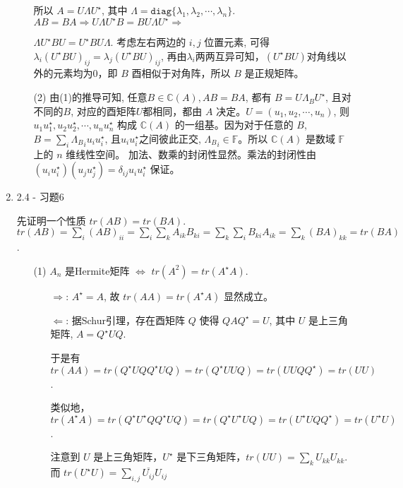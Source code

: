 \documentclass{article}
\begin{document}
\begin{spacing}{1.5}
\begin{enumerate}
\begin{itemize}
            所以 $A = U\Lambda U^\star$, 其中 $\Lambda = \mathtt{diag}\{\lambda_1, \lambda_2, \cdots, \lambda_n\}$. $AB=BA \Rightarrow U\Lambda U^\star B = B U\Lambda U^\star \Rightarrow$ 
            
            $\Lambda U^\star B U = U^\star B U \Lambda$. 考虑左右两边的 $i,j$ 位置元素, 可得 $\lambda_i (U^\star B U)_{ij} = \lambda_j (U^\star B U)_{ij}$, 再由$\lambda_i$两两互异可知，$(U^\star B U)$对角线以外的元素均为0，即 $B$ 酉相似于对角阵，所以 $B$ 是正规矩阵。
        \item[(2)] 由(1)的推导可知, 任意$B\in\mathbb{C}(A), AB=BA$, 都有 $B = U\Lambda_B U^\star$, 且对不同的$B$, 对应的酉矩阵$U$都相同，都由 $A$ 决定。$U = (u_1, u_2, \cdots, u_n)$, 则 $u_1u_1^\star, u_2u_2^\star,\cdots, u_nu_n^\star$ 构成 $\mathbb{C}(A)$
        的一组基。因为对于任意的 $B$, $B= \sum_i {\Lambda_B}_i u_iu_i^\star$, 且$u_iu_i^\star$之间彼此正交, ${\Lambda_B}_{i}\in\mathbb{F}$。所以 $\mathbb{C}(A)$ 是数域 $\mathbb{F}$ 上的 $n$ 维线性空间。
        加法、数乘的封闭性显然。乘法的封闭性由 $(u_iu_i^\star)(u_ju_j^\star) = \delta_{ij} u_iu_i^\star$ 保证。
        
    \end{itemize}
    
    

    \item 2.4 - 习题6
    
    先证明一个性质 $tr(AB) = tr(BA)$. $tr(AB) = \sum_{i} (AB)_{ii} = \sum_{i} \sum_{k} A_{ik}B_{ki} = \sum_{k}\sum_{i} B_{ki}A_{ik} = \sum_k (BA)_{kk} = tr(BA)$.

    \begin{itemize}
        \item [(1)] $A_n$ 是Hermite矩阵 $\Leftrightarrow$ $tr(A^2) = tr(A^\star A)$.
        \begin{itemize}
            \item [$\Rightarrow$:] $A^\star = A$, 故 $tr(AA) = tr(A^\star A)$ 显然成立。
            \item [$\Leftarrow$:] 据Schur引理，存在酉矩阵 $Q$ 使得 $QAQ^\star = U$, 其中 $U$ 是上三角矩阵, $A = Q^\star U Q$.
            
            于是有 $tr(AA) = tr(Q^\star U Q Q^\star U Q) = tr(Q^\star U U Q) = tr(UUQQ^\star) = tr(UU)$.
            
            类似地，$tr(A^\star A) = tr(Q^\star U^\star QQ^\star U Q) = tr(Q^\star U^\star U Q) = tr(U^\star U Q Q^\star) = tr(U^\star U)$. 
        
            注意到 $U$ 是上三角矩阵，$U^\star$ 是下三角矩阵，$tr(UU) = \sum_{k} U_{kk}U_{kk}$. 而 $tr(U^\star U) = \sum_{i,j}\overline{U_{ij}}U_{ij}$
            

\end{itemize}
\end{itemize}
\end{enumerate}
\end{spacing}
\end{document}
